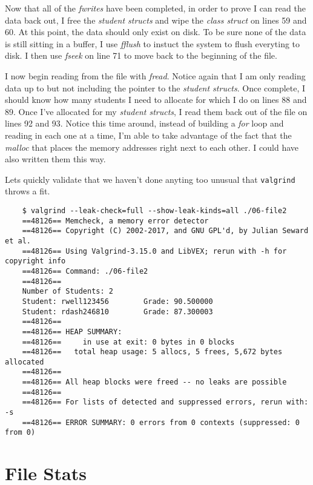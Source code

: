 \documentclass[../main.tex]{subfiles}
\begin{document}
	Now that all of the \textit{fwrites} have been completed, in order to prove I can read the data back out, I free the \textit{student structs} and wipe the \textit{class struct} on lines 59 and 60.  At this point, the data should only exist on disk.  To be sure none of the data is still sitting in a buffer, I use \textit{fflush} to instuct the system to flush everyting to disk.  I then use \textit{fseek} on line 71 to move back to the beginning of the file.
	
	I now begin reading from the file with \textit{fread}.  Notice again that I am only reading data up to but not including the pointer to the \textit{student structs}.  Once complete, I should know how many students I need to allocate for which I do on lines 88 and 89.  Once I've allocated for my \textit{student structs}, I read them back out of the file on lines 92 and 93.  Notice this time around, instead of building a \textit{for} loop and reading in each one at a time, I'm able to take advantage of the fact that the \textit{malloc} that places the memory addresses right next to each other.  I could have also written them this way.
	
	Lets quickly validate that we haven't done anyting too unusual that \texttt{valgrind} throws a fit.
	  
	\begin{verbatim}
	$ valgrind --leak-check=full --show-leak-kinds=all ./06-file2
	==48126== Memcheck, a memory error detector
	==48126== Copyright (C) 2002-2017, and GNU GPL'd, by Julian Seward et al.
	==48126== Using Valgrind-3.15.0 and LibVEX; rerun with -h for copyright info
	==48126== Command: ./06-file2
	==48126== 
	Number of Students: 2
	Student: rwell123456        Grade: 90.500000
	Student: rdash246810        Grade: 87.300003
	==48126== 
	==48126== HEAP SUMMARY:
	==48126==     in use at exit: 0 bytes in 0 blocks
	==48126==   total heap usage: 5 allocs, 5 frees, 5,672 bytes allocated
	==48126== 
	==48126== All heap blocks were freed -- no leaks are possible
	==48126== 
	==48126== For lists of detected and suppressed errors, rerun with: -s
	==48126== ERROR SUMMARY: 0 errors from 0 contexts (suppressed: 0 from 0)
	\end{verbatim}
	
	\section{File Stats}
	
	
\end{document}
